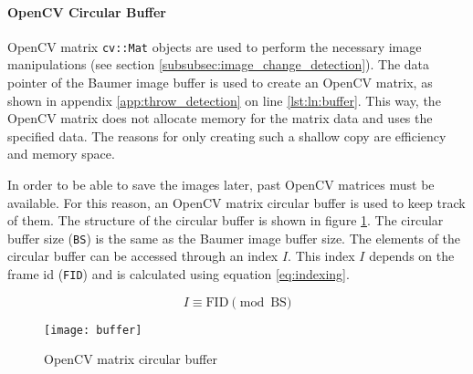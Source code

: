 \paragraph{OpenCV Circular Buffer}
OpenCV matrix \texttt{cv::Mat} objects are used to perform the necessary image manipulations (see section \ref{subsubsec:image_change_detection}).
The data pointer of the Baumer image buffer is used to create an OpenCV matrix, as shown in appendix \ref{app:throw_detection} on line \ref{lst:ln:buffer}.
This way, the OpenCV matrix does not allocate memory for the matrix data and uses the specified data.
The reasons for only creating such a shallow copy are efficiency and memory space.

In order to be able to save the images later, past OpenCV matrices must be available.
For this reason, an OpenCV matrix circular buffer is used to keep track of them.
The structure of the circular buffer is shown in figure \ref{fig:circular_buffer}.
The circular buffer size (\texttt{BS}) is the same as the Baumer image buffer size.
The elements of the circular buffer can be accessed through an index $I$.
This index $I$ depends on the frame id (\texttt{FID}) and is calculated using equation \ref{eq:indexing}.

\begin{equation}
  I \equiv \text{FID} \pmod{\text{BS}}
  \label{eq:indexing}
\end{equation}

\begin{figure}[hb]
  \centering
  \texttt{[image: buffer]}
  \caption{OpenCV matrix circular buffer}
  \label{fig:circular_buffer}
\end{figure}
